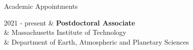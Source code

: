 \begin{rSection}{Academic Appointments}
	\begin{timeline}
		2021 - present & \textbf{Postdoctoral Associate}\\
			& Massachusetts Institute of Technology\\
			& Department of Earth, Atmospheric and Planetary Sciences
	\end{timeline}
\end{rSection}